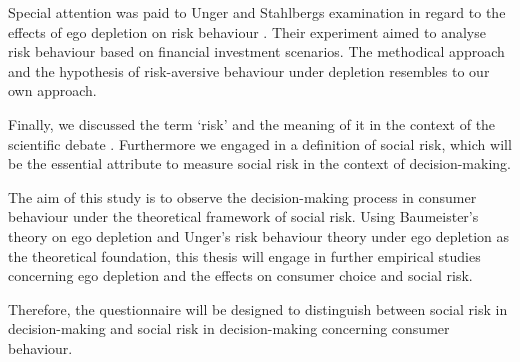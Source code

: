 Special attention was paid to Unger and Stahlbergs examination in regard to the effects of ego depletion on risk behaviour \citep{unger2011ego}. Their experiment aimed to analyse risk behaviour based on financial investment scenarios. The methodical approach and the hypothesis of risk-aversive behaviour under depletion resembles to our own approach.\par
Finally, we discussed the term ‘risk’ and the meaning of it in the context of the scientific debate \citep{ross1975perceived,dowling1994model}. Furthermore we engaged in a definition of social risk, which will be the essential attribute to measure social risk in the context of decision-making.\par
The aim of this study is to observe the decision-making process in consumer behaviour under the theoretical framework of social risk. Using Baumeister’s  theory on ego depletion and Unger’s risk behaviour theory under ego depletion as the theoretical foundation, this thesis will engage in further empirical studies concerning ego depletion and the effects on consumer choice and social risk.\par
Therefore, the questionnaire will be designed to distinguish between social risk in decision-making and social risk in decision-making concerning consumer behaviour.

